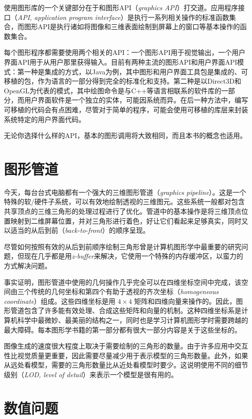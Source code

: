 \documentclass[lang=cn,12pt,marginpar=margintrue]{elegantbook}
\begin{document}
使用图形库的一个关键部分在于和图形API（\textit{graphics API}）打交道。应用程序接口（\textit{API, application program interface}）是执行一系列相关操作的标准函数集合，而图形API是执行诸如将图像和三维表面绘制到屏幕上的窗口等基本操作的函数集合。

每个图形程序都需要使用两个相关的API：一个图形API用于视觉输出，一个用户界面API用于从用户那里获得输入。目前有两种主流的图形API和用户界面API模式：第一种是集成的方式，以Java为例，其中图形和用户界面工具包是集成的、可移植的包，作为语言的一部分得到完全的标准化和支持。第二种是以Direct3D和OpenGL为代表的模式，其中绘图命令是与C++等语言相联系的软件库的一部分，而用户界面软件是一个独立的实体，可能因系统而异。在后一种方法中，编写可移植的代码会有点困难，尽管对于简单的程序，可能会使用可移植的库层来封装系统特定的用户界面代码。

无论你选择什么样的API，基本的图形调用将大致相同，而且本书的概念也适用。

\section{图形管道}

今天，每台台式电脑都有一个强大的三维图形管道（\textit{graphics pipeline}）。这是一个特殊的软/硬件子系统，可以有效地绘制透视的三维图元。这些系统一般都对包含共享顶点的三维三角形的处理过程进行了优化。管道中的基本操作是将三维顶点位置映射到二维屏幕位置，并对三角形进行着色，好让它们看起来足够真实，同时又以适当的从后到前（\textit{back-to-front}）的顺序呈现。

尽管如何按照有效的从后到前顺序绘制三角形曾是计算机图形学中最重要的研究问题，但现在几乎都是用\textit{z-buffer}来解决，它使用一个特殊的内存缓冲区，以蛮力的方式解决问题。

事实证明，图形管道中使用的几何操作几乎完全可以在四维坐标空间中完成，该空间由三个传统的几何坐标和第四个有助于透视的齐次坐标（\textit{homogeneous coordinate}）组成。这些四维坐标是用 $4 \times 4$ 矩阵和四维向量来操作的。因此，图形管道包含了许多能有效处理、合成这些矩阵和向量的机制。这种四维坐标系是计算机科学中最微妙、最美丽的结构之一，同时也是学习计算机图形学时需要跨越的最大障碍。每本图形学书籍的第一部分都有很大一部分内容是关于这些坐标的。

图像生成的速度很大程度上取决于需要绘制的三角形的数量。由于许多应用中交互性比视觉质量更重要，因此需要尽量减少用于表示模型的三角形数量。此外，如果从远处看模型，需要的三角形数量比从近处看模型时要少。这说明使用不同的细节级别（\textit{LOD, level of detail}）来表示一个模型是很有用的。

\section{数值问题}
\end{document}
